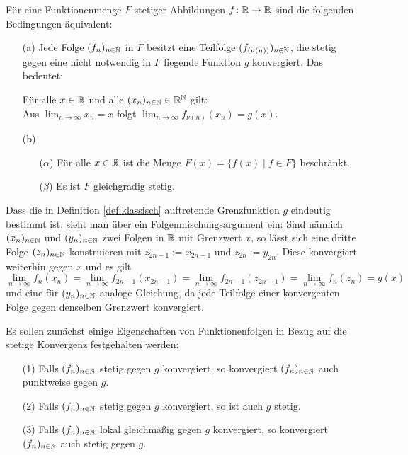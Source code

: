 \begin{defn} 
  \label{def:klassisch}
  Für eine Funktionenmenge $F$ stetiger Abbildungen $f \colon \mathbb{R} \to \mathbb{R}$ sind die folgenden Bedingungen äquivalent:
  \begin{itemize}
    \item[(a)] Jede Folge $(f_n)_{n \in \mathbb{N}}$ in $F$ besitzt eine Teilfolge $(f_{(\nu(n))})_{n \in \mathbb{N}}$, die stetig gegen eine nicht notwendig in $F$ liegende Funktion $g$ konvergiert. Das bedeutet:
      \begin{addmargin}[2em]{2em}%
        Für alle $x \in \mathbb{R}$ und alle $(x_n)_{n \in \mathbb{N}} \in \mathbb{R}^{\mathbb{N}}$ gilt: \\
        Aus $\lim_{n \to \infty} x_n = x$ folgt $\lim_{n \to \infty} f_{\nu(n)}(x_n) = g(x)$.
      \end{addmargin}
    \item[(b)]
      \begin{itemize}
        \item[($\alpha$)] Für alle $x \in \mathbb{R}$ ist die Menge $F(x) = \{ f(x) \mid f \in F\}$ beschränkt.
        \item[($\beta$)] Es ist $F$ gleichgradig stetig.
      \end{itemize}
  \end{itemize}
\end{defn}

Dass die in Definition \ref{def:klassisch} auftretende Grenzfunktion $g$ eindeutig bestimmt ist, sieht man über ein Folgenmischungsargument ein:
Sind nämlich $(x_n)_{n \in \mathbb{N}}$ und $(y_n)_{n \in \mathbb{N}}$ zwei Folgen in $\mathbb{R}$ mit Grenzwert $x$, so lässt sich eine dritte Folge $(z_n)_{n \in \mathbb{N}}$ konstruieren mit $z_{2n-1} := x_{2n-1}$ und $z_{2n} := y_{2n}$.
Diese konvergiert weiterhin gegen $x$ und es gilt 
\begin{displaymath}
   \lim_{n \to \infty} f_{n}(x_n) 
  =\lim_{n \to \infty} f_{2n-1}(x_{2n-1}) 
  =\lim_{n \to \infty} f_{2n-1}(z_{2n-1}) 
  =\lim_{n \to \infty} f_n(z_n) = g(x)
\end{displaymath}
und eine für $(y_n)_{n \in \mathbb{N}}$ analoge Gleichung, da jede Teilfolge einer konvergenten Folge gegen denselben Grenzwert konvergiert.

Es sollen zunächst einige Eigenschaften von Funktionenfolgen in Bezug auf die stetige Konvergenz festgehalten werden:

\begin{prop}
  \label{prop:stetigkonv}
  \begin{itemize}
    \item[(1)] Falls $(f_n)_{n \in \mathbb{N}}$ stetig gegen $g$ konvergiert, so konvergiert $(f_n)_{n \in \mathbb{N}}$ auch punktweise gegen $g$.
    \item[(2)] Falls $(f_n)_{n \in \mathbb{N}}$ stetig gegen $g$ konvergiert, so ist auch $g$ stetig.
    \item[(3)] Falls $(f_n)_{n \in \mathbb{N}}$ lokal gleichmäßig gegen $g$ konvergiert, so konvergiert $(f_n)_{n \in \mathbb{N}}$ auch stetig gegen $g$.
  \end{itemize}
\end{prop}

